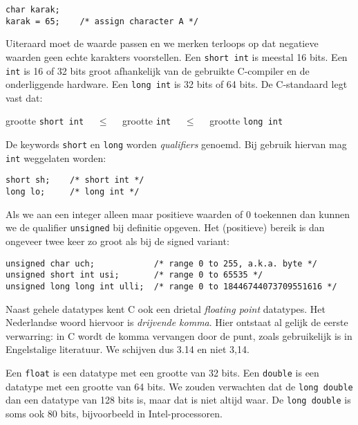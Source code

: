 \hspace*{1em}\texttt{char karak;}\\
\hspace*{1em}\texttt{karak = 65; \ \ \ /* assign character A */}

Uiteraard moet de waarde passen en we merken terloops op dat negatieve waarden geen echte karakters voorstellen. Een \texttt{short int} is meestal 16 bits. Een \texttt{int} is 16 of 32 bits groot afhankelijk van de gebruikte C-compiler en de onderliggende hardware. Een \texttt{long int} is 32 bits of 64 bits. De C-standaard legt vast dat:

\hspace*{1em}grootte \texttt{short int} $\quad\leq\quad$ grootte \texttt{int} $\quad\leq\quad$ grootte \texttt{long int}

De keywords \texttt{short} en \texttt{long} worden \textsl{qualifiers} genoemd. Bij gebruik hiervan mag \texttt{int} weggelaten worden:

\hspace*{1em}\texttt{short sh; \ \ \ /* short int */}\\
\hspace*{1em}\texttt{long lo; \ \ \ \ /* long int */}

Als we aan een integer alleen maar positieve waarden of 0 toekennen dan kunnen we de qualifier \texttt{unsigned} bij definitie opgeven. Het (positieve) bereik is dan ongeveer twee keer zo groot als bij de signed variant:

\hspace*{1em}\texttt{unsigned char uch; \ \ \ \ \ \ \ \ \ \ \ /* range 0 to 255, a.k.a. byte */}\\
\hspace*{1em}\texttt{unsigned short int usi; \ \ \ \ \ \ /* range 0 to 65535 */}\\
\hspace*{1em}\texttt{unsigned long long int ulli; \ /* range 0 to 18446744073709551616 */}

Naast gehele datatypes kent C ook een drietal \textsl{floating point} datatypes. Het Nederlandse woord hiervoor is \textsl{drijvende komma}. Hier ontstaat al gelijk de eerste verwarring: in C wordt de komma vervangen door de punt, zoals gebruikelijk is in Engelstalige literatuur. We schijven dus 3.14 en niet 3,14.

Een \texttt{float} is een datatype met een grootte van 32 bits. Een \texttt{double} is een datatype met een grootte van 64 bits. We zouden verwachten dat de \texttt{long double} dan een datatype van 128 bits is, maar dat is niet altijd waar. De \texttt{long double} is soms ook 80 bits, bijvoorbeeld in Intel-processoren.

